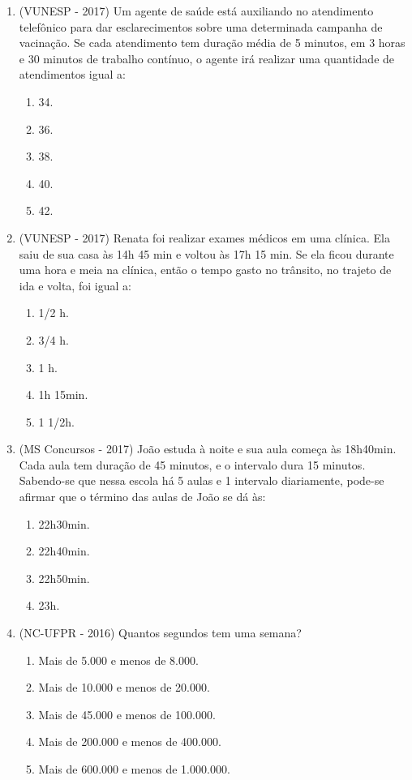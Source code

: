 \begin{enumerate}[1)]
 \item (VUNESP - 2017) Um agente de saúde está auxiliando no atendimento telefônico para dar esclarecimentos sobre uma determinada campanha de vacinação. Se cada atendimento tem duração média de 5 minutos, em 3 horas e 30 minutos de trabalho contínuo, o agente irá realizar uma quantidade de atendimentos igual a:
 \begin{enumerate}
 \item 34.
 \item 36.
 \item 38.
 \item 40.
 \item 42.
 \end{enumerate}

 \item (VUNESP - 2017) Renata foi realizar exames médicos em uma clínica. Ela saiu de sua casa às 14h 45 min e voltou às 17h 15 min. Se ela ficou durante uma hora e meia na clínica, então o tempo gasto no trânsito, no trajeto de ida e volta, foi igual a:
 \begin{enumerate}
 \item 1/2 h.
 \item 3/4 h.
 \item 1 h.
 \item 1h 15min.
 \item 1 1/2h.
 \end{enumerate}

 \item (MS Concursos - 2017) João estuda à noite e sua aula começa às 18h40min. Cada aula tem duração de 45 minutos, e o intervalo dura 15 minutos. Sabendo-se que nessa escola há 5 aulas e 1 intervalo diariamente, pode-se afirmar que o término das aulas de João se dá às:
 \begin{enumerate}
 \item 22h30min.
 \item 22h40min.
 \item 22h50min.
 \item 23h.
 \end{enumerate}

 \item (NC-UFPR - 2016) Quantos segundos tem uma semana?
 \begin{enumerate}
 \item Mais de 5.000 e menos de 8.000.
 \item Mais de 10.000 e menos de 20.000.
 \item Mais de 45.000 e menos de 100.000.
 \item Mais de 200.000 e menos de 400.000.
 \item Mais de 600.000 e menos de 1.000.000.
 \end{enumerate}


\end{enumerate}
